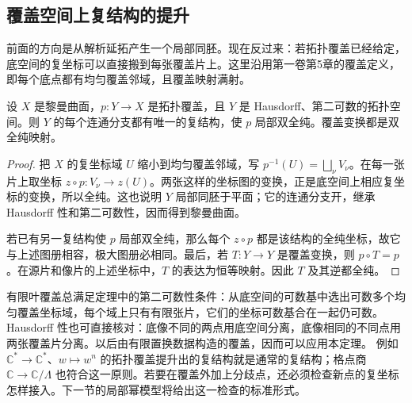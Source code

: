 \subsection{覆盖空间上复结构的提升}
\label{g4:subsec:0201:04}

前面的方向是从解析延拓产生一个局部同胚。现在反过来：若拓扑覆盖已经给定，底空间的复坐标可以直接搬到每张覆盖片上。这里沿用第一卷第5章的覆盖定义，即每个底点都有均匀覆盖邻域，且覆盖映射满射。

\begin{theorem}
	\label{g4:thm:0201:lift-complex-structure}
	设 \(X\) 是黎曼曲面，\(p:Y\to X\) 是拓扑覆盖，且 \(Y\) 是 Hausdorff、第二可数的拓扑空间。则 \(Y\) 的每个连通分支都有唯一的复结构，使 \(p\) 局部双全纯。覆盖变换都是双全纯映射。
\end{theorem}
\begin{proof}
	把 \(X\) 的复坐标域 \(U\) 缩小到均匀覆盖邻域，写 \(p^{-1}(U)=\bigsqcup_\nu V_\nu\)。在每一张片上取坐标 \(z\circ p:V_\nu\to z(U)\)。两张这样的坐标图的变换，正是底空间上相应复坐标的变换，所以全纯。这也说明 \(Y\) 局部同胚于平面；它的连通分支开，继承 Hausdorff 性和第二可数性，因而得到黎曼曲面。

	若已有另一复结构使 \(p\) 局部双全纯，那么每个 \(z\circ p\) 都是该结构的全纯坐标，故它与上述图册相容，极大图册必相同。最后，若 \(T:Y\to Y\) 是覆盖变换，则 \(p\circ T=p\)。在源片和像片的上述坐标中，\(T\) 的表达为恒等映射。因此 \(T\) 及其逆都全纯。
\end{proof}

有限叶覆盖总满足定理中的第二可数性条件：从底空间的可数基中选出可数多个均匀覆盖坐标域，每个域上只有有限张片，它们的坐标可数基合在一起仍可数。Hausdorff 性也可直接核对：底像不同的两点用底空间分离，底像相同的不同点用两张覆盖片分离。以后由有限置换数据构造的覆盖，因而可以应用本定理。
\ProseParagraphBreak
例如 \(\mathbb C^*\to\mathbb C^*\)、\(w\mapsto w^n\) 的拓扑覆盖提升出的复结构就是通常的复结构；格点商 \(\mathbb C\to\mathbb C/\Lambda\) 也符合这一原则。若要在覆盖外加上分歧点，还必须检查新点的复坐标怎样接入。下一节的局部幂模型将给出这一检查的标准形式。
